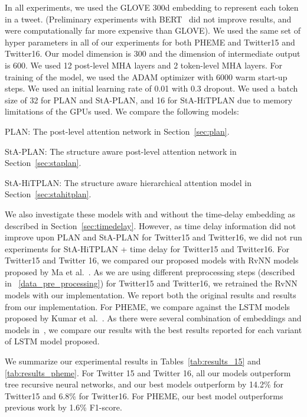 \documentclass[letterpaper]{article} %
\begin{document}
In all experiments, we used the GLOVE 300d \cite{pennington2014glove} embedding to represent each token in a tweet. (Preliminary experiments with BERT~\cite{devlin2018bert} did not improve results, and were computationally far more expensive than GLOVE). We used the same set of hyper parameters in all of our experiments for both PHEME and Twitter15 and Twitter16. Our model dimension is 300 and the dimension of intermediate output is 600. We used 12 post-level MHA layers and 2 token-level MHA layers. For training of the model, we used the ADAM optimizer with 6000 warm start-up steps. We used an initial learning rate of 0.01 with 0.3 dropout. We used a batch size of 32 for PLAN and StA-PLAN, and 16 for StA-HiTPLAN due to memory limitations of the GPUs used. We compare the following models:
\begin{itemize*}
\item PLAN: The post-level attention network in Section~\ref{sec:plan}.
\item StA-PLAN: The structure aware post-level attention network in Section~\ref{sec:staplan}.
\item StA-HiTPLAN: The structure aware hierarchical attention model in Section~\ref{sec:stahitplan}.
\end{itemize*}
We also investigate these models with and without the time-delay embedding as described in Section~\ref{sec:timedelay}. However, as time delay information did not improve upon PLAN and StA-PLAN for Twitter15 and Twitter16, we did not run experiments for StA-HiTPLAN + time delay for Twitter15 and Twitter16.
For Twitter15 and Twitter 16, we compared our proposed models with RvNN models proposed by Ma et al.~. As we are using different preprocessing steps (described in ~\ref{data_pre_processing}) for Twitter15 and Twitter16, we retrained the RvNN models with our implementation. We report both the original results and results from our implementation. For PHEME, we compare against the LSTM models proposed by Kumar et al.~. As there were several combination of embeddings and models in~\cite{kumar19}, we compare our results with the best results reported for each variant of LSTM model proposed.

We summarize our experimental results in Tables~\ref{tab:results_15} and \ref{tab:results_pheme}.
For Twitter 15 and Twitter 16, all our models outperform tree recursive neural networks, and our best models outperform by 14.2\% for Twitter15 and 6.8\% for Twitter16. For PHEME, our best model outperforms previous work by 1.6\% F1-score.
\end{document}
